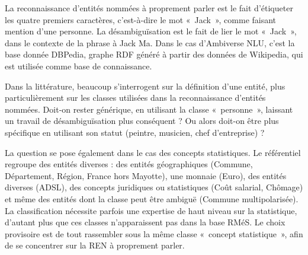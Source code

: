 \vspace{10pt}

La reconnaissance d'entités nommées à proprement parler est le fait d'étiqueter les quatre premiers caractères, c'est-à-dire le mot «~Jack~», comme faisant mention d'une personne. La désambiguïsation est le fait de lier le mot «~Jack~», dans le contexte de la phrase à Jack Ma. Dans le cas d'Ambiverse NLU, c'est la base donnée DBPedia, graphe RDF généré à partir des données de Wikipedia, qui est utilisée comme base de connaissance.
\newline

Dans la littérature, beaucoup s'interrogent sur la définition d'une entité, plus particulièrement sur les classes utilisées dans la reconnaissance d'entités nommées. Doit-on rester générique, en utilisant la classe «~personne~», laissant un travail de désambiguïsation plus conséquent ? Ou alors doit-on être plus spécifique en utilisant son statut (peintre, musicien, chef d'entreprise) ?

La question se pose également dans le cas des concepts statistiques. Le référentiel regroupe des entités diverses : des entités géographiques (Commune, Département, Région, France hors Mayotte), une monnaie (Euro), des entités diverses (ADSL), des concepts juridiques ou statistiques (Coût salarial, Chômage) et même des entités dont la classe peut être ambiguë (Commune multipolarisée). La classification nécessite parfois une expertise de haut niveau sur la statistique, d'autant plus que ces classes n'apparaissent pas dans la base RMéS. Le choix provisoire est de tout rassembler sous la même classe «~concept statistique~», afin de se concentrer sur la REN à proprement parler.
\label{section 2.1.2 - REN et Désambiguïsation}

